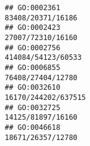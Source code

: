 \documentclass[
]{article}
\begin{document}
\begin{verbatim}
## GO:0002361                                                                                                                                                                                                                                                                                                                                                                                            83408/20371/16186
## GO:0002423                                                                                                                                                                                                                                                                                                                                                                                            27007/72310/16160
## GO:0002756                                                                                                                                                                                                                                                                                                                                                                                           414084/54123/60533
## GO:0006855                                                                                                                                                                                                                                                                                                                                                                                            76408/27404/12780
## GO:0032610                                                                                                                                                                                                                                                                                                                                                                                          16170/244202/637515
## GO:0032725                                                                                                                                                                                                                                                                                                                                                                                            14125/81897/16160
## GO:0046618                                                                                                                                                                                                                                                                                                                                                                                            18671/26357/12780

\end{verbatim}
\end{document}
